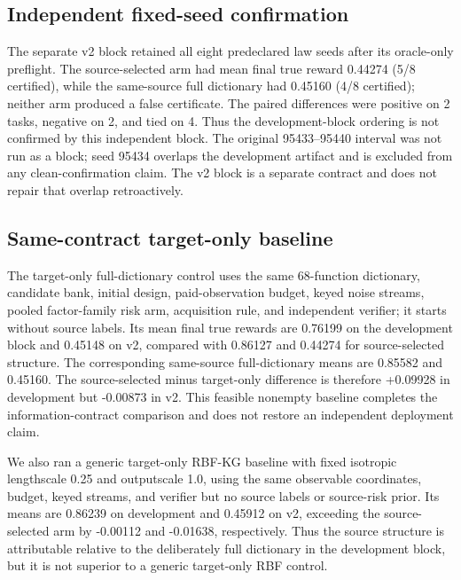 \subsection{Independent fixed-seed confirmation}

The separate v2 block retained all eight predeclared law seeds after its
oracle-only preflight.  The source-selected arm had mean final true reward
0.44274 (5/8 certified), while the same-source full dictionary had 0.45160
(4/8 certified); neither arm produced a false certificate.  The paired
differences were positive on 2 tasks, negative on 2, and tied on 4.  Thus the
development-block ordering is not confirmed by this independent block.  The
original 95433--95440 interval was not run as a block; seed 95434 overlaps the
development artifact and is excluded from any clean-confirmation claim.  The
v2 block is a separate contract and does not repair that overlap retroactively.



\subsection{Same-contract target-only baseline}

The target-only full-dictionary control uses the same 68-function dictionary,
candidate bank, initial design, paid-observation budget, keyed noise streams,
pooled factor-family risk arm, acquisition rule, and independent verifier; it
starts without source labels.  Its mean final true rewards are 0.76199 on the
development block and 0.45148 on v2, compared with 0.86127 and 0.44274 for
source-selected structure.  The corresponding same-source full-dictionary
means are 0.85582 and 0.45160.  The source-selected minus target-only
difference is therefore +0.09928 in development but -0.00873 in v2.  This
feasible nonempty baseline completes the information-contract comparison and
does not restore an independent deployment claim.

We also ran a generic target-only RBF-KG baseline with fixed isotropic
lengthscale 0.25 and outputscale 1.0, using the same observable coordinates,
budget, keyed streams, and verifier but no source labels or source-risk prior.
Its means are 0.86239 on development and 0.45912 on v2, exceeding the
source-selected arm by -0.00112 and -0.01638, respectively.  Thus the source
structure is attributable relative to the deliberately full dictionary in the
development block, but it is not superior to a generic target-only RBF control.

